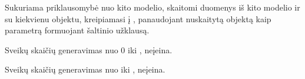 \documentclass[letterpaper,10pt,lithuanian]{sphinxmanual}
\begin{document}
\begin{fulllineitems}
\label{\detokenize{dimensijos:param.read}}
\pysigstartsignatures
\pysiglinewithargsret
{}
{}
{}
\pysigstopsignatures
\sphinxAtStartPar
Sukuriama priklausomybė nuo kito modelio, skaitomi duomenys iš kito modelio
ir su kiekvienu objektu, kreipiamasi į {\hyperref[\detokenize{dimensijos:resource.source}]{}}, panaudojant
nuskaitytą objektą kaip parametrą formuojant šaltinio užklausą.

\end{fulllineitems}


\begin{fulllineitems}
\label{\detokenize{dimensijos:param.range}}
\pysigstartsignatures
\pysiglinewithargsret
{}
{}
{}
\pysigstopsignatures
\sphinxAtStartPar
Sveikų skaičių generavimas nuo 0 iki ,  neįeina.

\end{fulllineitems}



\begin{fulllineitems}

\pysigstartsignatures
\pysiglinewithargsret
{}
{\sphinxparamcomma {}}
{}
\pysigstopsignatures
\sphinxAtStartPar
Sveikų skaičių generavimas nuo  iki ,  neįeina.

\end{fulllineitems}

\end{document}
